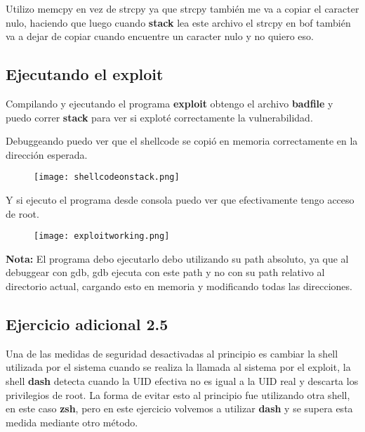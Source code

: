 \documentclass[11pt]{article}
\begin{document}
Utilizo memcpy en vez de strcpy ya que strcpy también me va a copiar el caracter nulo,
haciendo que luego cuando \textbf{stack} lea este archivo el strcpy en bof también
va a dejar de copiar cuando encuentre un caracter nulo y no quiero eso.

\subsection*{Ejecutando el exploit}

Compilando y ejecutando el programa \textbf{exploit} obtengo el archivo \textbf{badfile}
y puedo correr \textbf{stack} para ver si exploté correctamente la vulnerabilidad.

Debuggeando puedo ver que el shellcode se copió en memoria correctamente en la 
dirección esperada.

\begin{figure}[h!]
    \begin{center}
        \texttt{[image: shellcodeonstack.png]}
    \end{center}
\end{figure}

Y si ejecuto el programa desde consola puedo ver que efectivamente tengo acceso
de root.

\begin{figure}[h!]
    \begin{center}
        \texttt{[image: exploitworking.png]}
    \end{center}
\end{figure}

\textbf{Nota:} El programa debo ejecutarlo debo utilizando su path absoluto,
ya que al debuggear con gdb, gdb ejecuta con este path y no con su path relativo
al directorio actual, cargando esto en memoria y modificando todas las direcciones.

\subsection*{Ejercicio adicional 2.5}
Una de las medidas de seguridad desactivadas al principio es cambiar la shell utilizada
por el sistema cuando se realiza la llamada al sistema por el exploit, la shell
\textbf{dash} detecta cuando la UID efectiva no es igual a la UID real y descarta
los privilegios de root. La forma de evitar esto al principio fue utilizando otra shell,
en este caso \textbf{zsh}, pero en este ejercicio volvemos a utilizar \textbf{dash}
y se supera esta medida mediante otro método.
\end{document}
